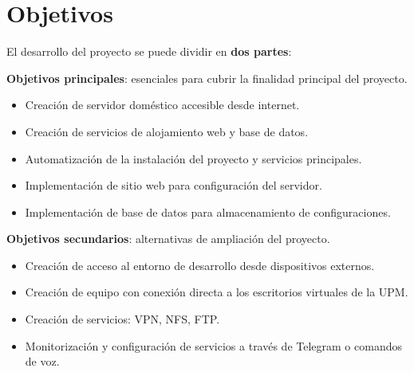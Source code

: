 \section{Objetivos} \label{chapters:objetivos:sections:objetivos}

El desarrollo del proyecto se puede dividir en \textbf{dos partes}:

\textbf{Objetivos principales}: esenciales para cubrir la finalidad principal del proyecto.
\begin{itemize}[itemsep=0em]
    \item Creación de servidor doméstico accesible desde internet.
    \item Creación de servicios de alojamiento web y base de datos.
    \item Automatización de la instalación del proyecto y servicios principales.
    \item Implementación de sitio web para configuración del servidor.
    \item Implementación de base de datos para almacenamiento de configuraciones.
\end{itemize}

\textbf{Objetivos secundarios}: alternativas de ampliación del proyecto.
\begin{itemize}[itemsep=0em]
    \item Creación de acceso al entorno de desarrollo desde dispositivos externos.
    \item Creación de equipo con conexión directa a los escritorios virtuales de la UPM.
    \item Creación de servicios: VPN, NFS, FTP.
    \item Monitorización y configuración de servicios a través de Telegram o comandos de voz.
\end{itemize}

